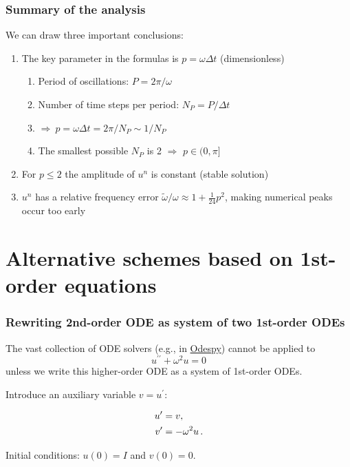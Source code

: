 \documentclass{beamer}
\begin{document}
\begin{frame}
\frametitle{Summary of the analysis}

We can draw three important conclusions:

\begin{enumerate}
\item The key parameter in the formulas is $p=\omega\Delta t$ (dimensionless)
\begin{enumerate}

  \item Period of oscillations: $P=2\pi/\omega$

  \item Number of time steps per period: $N_P=P/\Delta t$

  \item $\Rightarrow\ p=\omega\Delta t = 2\pi/ N_P \sim 1/N_P$

  \item The smallest possible $N_P$ is 2 $\Rightarrow$ $p\in (0,\pi]$

\end{enumerate}

\noindent
\item For $p\leq 2$ the amplitude of $u^n$ is constant (stable solution)

\item $u^n$ has a relative frequency error
   $\tilde\omega/\omega \approx 1 + \frac{1}{24}p^2$, making numerical
   peaks occur too early
\end{enumerate}

\noindent
\end{frame}

\section{Alternative schemes based on 1st-order equations}
\label{vib:model2x2}

\begin{frame}
\frametitle{Rewriting 2nd-order ODE as system of two 1st-order ODEs}

The vast collection of ODE solvers (e.g., in \href{{https://github.com/hplgit/odespy}}{Odespy}) cannot be applied to
\[ u^{\prime\prime} + \omega^2 u = 0\]
unless we write this higher-order ODE as a system of 1st-order ODEs.

Introduce an auxiliary variable $v=u^{\prime}$:

\begin{align}
u^{\prime} &= v,
\label{vib:model2x2:ueq}\\ 
v^{\prime} &= -\omega^2 u
\label{vib:model2x2:veq}
\tp
\end{align}

Initial conditions: $u(0)=I$ and $v(0)=0$.
\end{frame}
\end{document}
